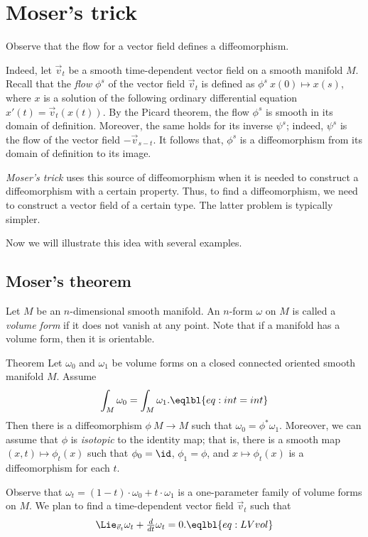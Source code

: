 \chapter*{Moser's trick}

Observe that the flow for a vector field defines a diffeomorphism.

Indeed, let $\vec v_t$ be a smooth time-dependent vector field on a smooth manifold $M$.
Recall that the \emph{flow} $\phi^s$ of the vector field $\vec v_t$
is defined as $\phi^s\:x(0)\mapsto x(s)$, where $x$ is a solution of the following ordinary differential equation $x'(t)=\vec v_t(x(t))$.
By the Picard theorem, the flow $\phi^s$ is smooth in its domain of definition.
Moreover, the same holds for its inverse $\psi^s$;
indeed, $\psi^s$ is the flow of the vector field $-\vec v_{s-t}$.
It follows that, $\phi^s$ is a diffeomorphism from its domain of definition to its image.

\emph{Moser's trick} uses this source of diffeomorphism when it is needed to construct a diffeomorphism with a certain property.
Thus, to find a diffeomorphism, we need to construct a vector field of a certain type.
The latter problem is typically simpler.

Now we will illustrate this idea with several examples.

\section{Moser's theorem}

Let $M$ be an $n$-dimensional smooth manifold.
An $n$-form $\omega$ on $M$ is called a \emph{volume form} if it does not vanish at any point.
Note that if a manifold has a volume form, then it is orientable.

\begin{thm}{Theorem}
Let $\omega_0$ and $\omega_1$ be volume forms on a closed connected oriented smooth manifold $M$.
Assume
\[\int_M\omega_0=\int_M\omega_1.\eqlbl{eq:int=int}\]
Then there is a diffeomorphism $\phi\:M\to M$ such that $\omega_0=\phi^*\omega_1$.
Moreover, we can assume that $\phi$ is \emph{isotopic} to the identity map; that is, there is a smooth map $(x,t)\mapsto \phi_t(x)$ such that $\phi_0=\id$, $\phi_1=\phi$, and $x\mapsto \phi_t(x)$ is a diffeomorphism for each $t$.
\end{thm}

Observe that $\omega_t=(1-t)\cdot\omega_0+t\cdot\omega_1$ is a one-parameter family of volume forms on $M$.
We plan to find a time-dependent vector field $\vec v_t$ such that
\[\Lie_{\vec v_t}\omega_t+\tfrac d{dt}\omega_t=0.\eqlbl{eq:LVvol}\]

